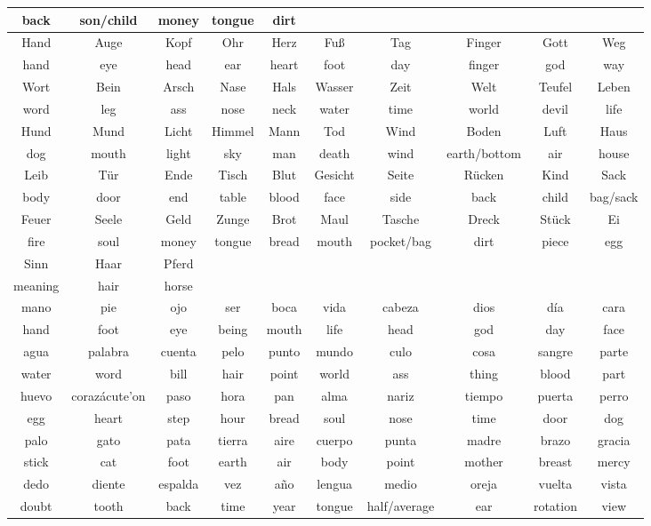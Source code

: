 \begin{table}[htb]
{\begin{tabular}{|c|c|c|c|c|c|c|c|c|c|}
back & son/child & money & tongue & dirt &  &  &  &  & \\
\hline
Hand & Auge & Kopf & Ohr & Herz & Fu\ss & Tag & Finger & Gott & Weg \\
hand & eye & head & ear & heart & foot & day & finger & god & way \\
\hline
Wort & Bein & Arsch & Nase & Hals & Wasser & Zeit & Welt & Teufel & Leben \\
word & leg & ass & nose & neck & water & time & world & devil & life \\
\hline
Hund & Mund & Licht & Himmel & Mann & Tod & Wind & Boden & Luft & Haus \\
dog & mouth & light & sky & man & death & wind & earth/bottom & air & house \\
\hline
Leib & T\"{u}r & Ende & Tisch & Blut & Gesicht & Seite & R\"{u}cken & Kind & Sack \\
body & door & end & table & blood & face & side & back & child & bag/sack \\
\hline
Feuer & Seele & Geld & Zunge & Brot & Maul & Tasche & Dreck & St\"{u}ck & Ei \\
fire & soul & money & tongue & bread & mouth & pocket/bag & dirt & piece & egg \\
Sinn & Haar & Pferd &  &  &  &  &  &  & \\
meaning & hair & horse &  &  &  &  &  &  & \\
\hline
mano & pie & ojo & ser & boca & vida & cabeza & dios & d\'{i}a & cara \\
hand & foot & eye & being & mouth & life & head & god & day & face \\
\hline
agua & palabra & cuenta & pelo & punto & mundo & culo & cosa & sangre & parte \\
water & word & bill & hair & point & world & ass & thing & blood & part \\
\hline
huevo & coraz\'acute'{o}n & paso & hora & pan & alma & nariz & tiempo & puerta & perro \\
egg & heart & step & hour & bread & soul & nose & time & door & dog \\
\hline
palo & gato & pata & tierra & aire & cuerpo & punta & madre & brazo & gracia \\
stick & cat & foot & earth & air & body & point & mother & breast & mercy \\
\hline
dedo & diente & espalda & vez & a\~{n}o & lengua & medio & oreja & vuelta & vista \\
doubt & tooth & back & time & year & tongue & half/average & ear & rotation & view \\
\hline
\end{tabular}}
\end{table}